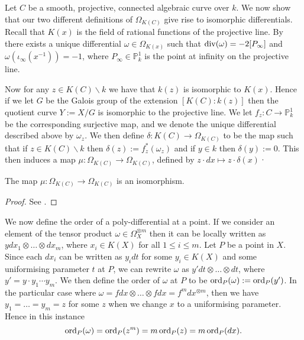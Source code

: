 Let $C$ be a smooth, projective, connected algebraic curve over $k$.
We now show that our two different definitions of $\Omega_{K(C)}$ give rise to isomorphic differentials.
Recall that $K(x)$ is the field of rational functions of the projective line.
By \cite[Prop. 1.7.4]{stichtenoth} there exists a unique differential $\omega \in \Omega_{K(x)}$ such that $\operatorname{div} (\omega) = -2[P_{\infty}]$ and $\omega(\iota_\infty(x^{-1})) = -1$, where $P_\infty \in \mathbb P_k^1$ is the point at infinity on the projective line.


Now for any $z\in K(C) \backslash k$ we have that $k(z)$ is isomorphic to $K(x)$.
Hence if we let $G$ be the Galois group of the extension $[K(C):k(z)]$ then the quotient curve $Y:=X/G$ is isomorphic to the projective line.
We let $f_z\colon C \rightarrow \mathbb P_k^1$ be the corresponding surjective map, and we denote the unique differential described above by $\omega_z$.
We then define $\delta\colon K(C) \rightarrow \Omega_{K(C)}$ to be the map such that if $z\in K(C)\backslash k$ then $\delta (z) := f_z^*(\omega_z)$ and if $y\in k$ then $\delta(y):=0$.
This then induces a map $\mu\colon \Omega_{K(C)} \rightarrow \Omega_{K(C)}$, defined by $z\cdot dx \mapsto z\cdot \delta(x)$·

    \begin{thm}
    The map $\mu\colon \Omega_{K(C)} \rightarrow \Omega_{K(C)}$ is an isomorphism.
    \end{thm}
    \begin{proof}
    See \cite[Thm. 4.3.2]{stichtenoth}.
    \end{proof}

We now define the order of a poly-differential at a point.
If we consider an element of the tensor product $\omega \in \Omega_X^{\otimes m}$ then it can be locally written as $y dx_1\otimes \ldots \otimes dx_m$, where $x_i \in K(X)$ for all $1 \leq i \leq m$.
Let $P$ be a point in $X$.
Since each $dx_i$ can be written as $y_i dt$ for some $y_i\in K(X)$ and some uniformising parameter $t$ at $P$, we can rewrite $\omega$ as $y' dt \otimes \ldots \otimes dt$, where $y' = y \cdot y_1 \cdots y_m$.
We then define the order of $\omega$ at $P$ to be $\operatorname{ord}_P(\omega ) := \operatorname{ord}_P(y')$.
In the particular case where $\omega = fdx \otimes \ldots \otimes fdx = f^m dx^{\otimes m}$, then we have $y_1 = \ldots = y_m = z$ for some $z$ when we change $x$ to a uniformising parameter.
Hence in this instance 
    \[ 
    \operatorname{ord}_P(\omega) = \operatorname{ord}_P(z^m) = m\operatorname{ord}_P(z) = m\operatorname{ord}_P(dx).
    \]





